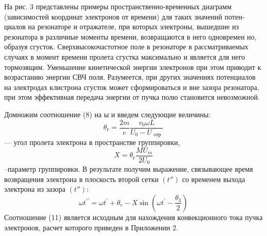 На рис. 3 представлены примеры пространственно-временных диаграмм
(зависимостей координат электронов от времени) для таких значений потен­
циалов на резонаторе и отражателе, при которых электроны, вышедшие из
резонатора в различные моменты времени, возвращаются в него одновремен­
но, образуя сгусток. Сверхвысокочастотное поле в резонаторе в рассматри­ваемых случаях в момент времени пролета сгустка максимально и является
для него тормозящим. Уменьшение кинетической энергии электронов при
этом приводит к возрастанию энергии СВЧ поля. Разумеется, при других
значениях потенциалов на электродах клистрона сгусток может сформиро­ваться и вне зазора резонатора, при этом эффективная передача энергии от
пучка полю становится невозможной.

Домножим соотношение (8) на ы и введем следующие величины:
\begin{equation}
	\theta _ { \text{г} } = \frac { 2 m } { e } \frac { v _ { 0 } \omega L } { U _ { 0 } - U _ { \text{ oтр } } }
\end{equation}— угол пролета электрона в пространстве группировки,
\begin{equation}
	X = \theta _ { \text{г} } \frac{M U _ { m } } { 2 U _ { 0 } }
\end{equation}--параметр группировки. В результате получим выражение, связывающее
время возвращения электрона в плоскость второй сетки $(t'' )$ со временем
выхода электрона из зазора $(t'')$:
\begin{equation}
	\omega t ^ { \prime \prime } = \omega t ^ { \prime } + \theta _ { r } - X \sin \left( \omega t ^ { \prime } - \frac { \theta _ { 3 } } { 2 } \right)
\end{equation}
Соотношение (11) является исходным для нахождения конвекционного
тока пучка электронов, расчет которого приведен в Приложении 2.

